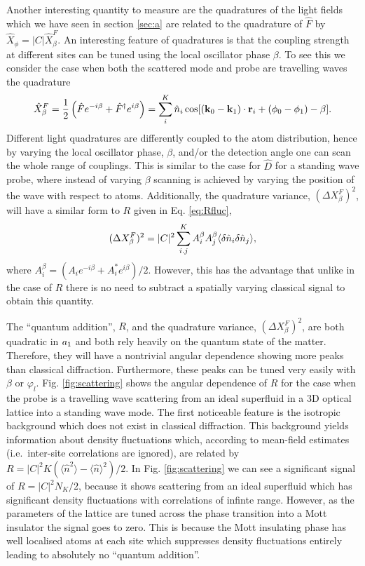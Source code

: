 Another interesting quantity to measure are the quadratures of the
light fields which we have seen in section \ref{sec:a} are related to
the quadrature of $\hat{F}$ by $\hat{X}_\phi = |C|
\hat{X}^F_\beta$. An interesting feature of quadratures is that the
coupling strength at different sites can be tuned using the local
oscillator phase $\beta$. To see this we consider the case when both
the scattered mode and probe are travelling waves the quadrature
\begin{equation} 
  \label{eq:Xtrav}
  \hat{X}^F_\beta = \frac{1}{2} \left( \hat{F} e^{-i \beta} +
    \hat{F}^\dagger e^{i \beta} \right) = \sum_i^K \hat{n}_i\cos[(\mathbf{k}_0 - \mathbf{k}_1) \cdot
  \mathbf{r}_i + (\phi_0 - \phi_1) - \beta].
\end{equation} 
Different light quadratures are differently coupled to the atom
distribution, hence by varying the local oscillator phase, $\beta$,
and/or the detection angle one can scan the whole range of
couplings. This is similar to the case for $\hat{D}$ for a standing
wave probe, where instead of varying $\beta$ scanning is achieved by
varying the position of the wave with respect to atoms. Additionally,
the quadrature variance, $(\Delta X^F_\beta)^2$, will have a similar
form to $R$ given in Eq. \eqref{eq:Rfluc},
\begin{equation}
  (\Delta X^F_\beta)^2 = |C|^2 \sum_{i.j}^K A_i^\beta A_j^\beta
  \langle \delta \hat{n}_i \delta \hat{n}_j \rangle,
\end{equation}
where $A_i^\beta = (A_i e^{-i\beta} + A_i^* e^{i \beta})/2$.  However,
this has the advantage that unlike in the case of $R$ there is no need
to subtract a spatially varying classical signal to obtain this
quantity.

The ``quantum addition'', $R$, and the quadrature variance,
$(\Delta X^F_\beta)^2$, are both quadratic in $a_1$ and both rely
heavily on the quantum state of the matter. Therefore, they will have
a nontrivial angular dependence showing more peaks than classical
diffraction. Furthermore, these peaks can be tuned very easily with
$\beta$ or $\varphi_l$. Fig. \ref{fig:scattering} shows the angular
dependence of $R$ for the case when the probe is a travelling wave
scattering from an ideal superfluid in a 3D optical lattice into a
standing wave mode. The first noticeable feature is the isotropic
background which does not exist in classical diffraction. This
background yields information about density fluctuations which,
according to mean-field estimates (i.e.~inter-site correlations are
ignored), are related by
$R = |C|^2 K( \langle \hat{n}^2 \rangle - \langle \hat{n} \rangle^2
)/2$. In Fig. \ref{fig:scattering} we can see a significant signal of
$R = |C|^2 N_K/2$, because it shows scattering from an ideal
superfluid which has significant density fluctuations with
correlations of infinte range. However, as the parameters of the
lattice are tuned across the phase transition into a Mott insulator
the signal goes to zero. This is because the Mott insulating phase has
well localised atoms at each site which suppresses density
fluctuations entirely leading to absolutely no ``quantum addition''.

